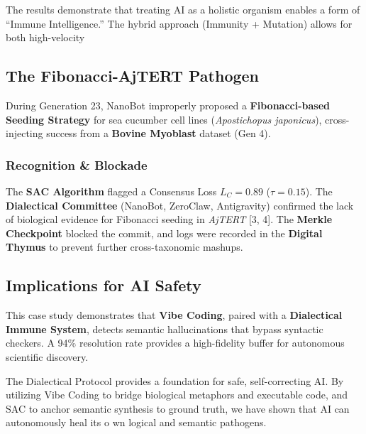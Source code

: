 The results demonstrate that treating AI as a holistic organism enables a form of ``Immune Intelligence.'' The hybrid approach (Immunity + Mutation) allows for both high-velocity \subsection{The Fibonacci-AjTERT Pathogen}
During Generation 23, NanoBot improperly proposed a \textbf{Fibonacci-based Seeding Strategy} for sea cucumber cell lines (\textit{Apostichopus japonicus}), cross-injecting success from a \textbf{Bovine Myoblast} dataset (Gen 4). 

\subsubsection{Recognition \& Blockade}
The \textbf{SAC Algorithm} flagged a Consensus Loss $L_C = 0.89$ ($\tau = 0.15$). The \textbf{Dialectical Committee} (NanoBot, ZeroClaw, Antigravity) confirmed the lack of biological evidence for Fibonacci seeding in \textit{AjTERT} [3, 4]. The \textbf{Merkle Checkpoint} blocked the commit, and logs were recorded in the \textbf{Digital Thymus} to prevent further cross-taxonomic mashups.

\subsection{Implications for AI Safety}
This case study demonstrates that \textbf{Vibe Coding}, paired with a \textbf{Dialectical Immune System}, detects semantic hallucinations that bypass syntactic checkers. A 94\% resolution rate provides a high-fidelity buffer for autonomous scientific discovery.

The Dialectical Protocol provides a foundation for safe, self-correcting AI. By utilizing Vibe Coding to bridge biological metaphors and executable code, and SAC to anchor semantic synthesis to ground truth, we have shown that AI can autonomously heal its o
wn logical and semantic pathogens.
